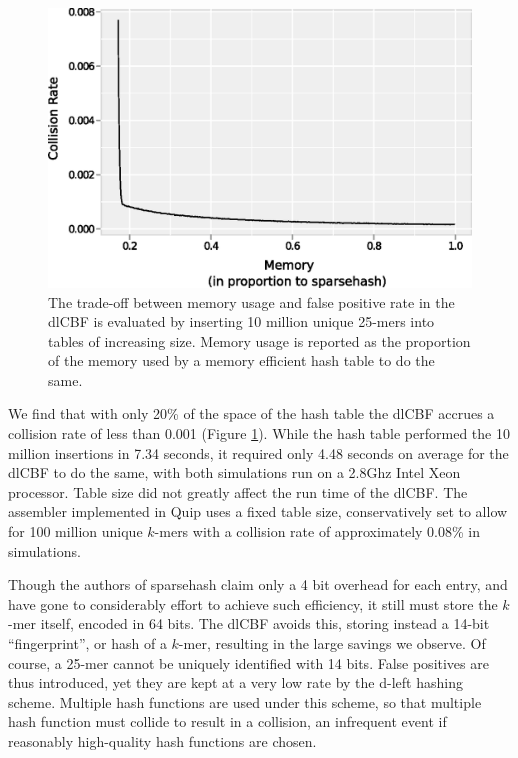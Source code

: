 \documentclass[a4,center,fleqn]{NAR}
\begin{document}
\begin{figure}[h]
\centerline{\includegraphics[width=\columnwidth]{dlcbf.eps}}
\caption{
The trade-off between memory usage and false positive rate in the dlCBF is
evaluated by inserting 10 million unique 25-mers into tables of increasing
size. Memory usage is reported as the proportion of the memory used by a
memory efficient hash table to do the same.
}
\label{fig:dlcbf_bench}
\end{figure}

We find that with only 20\% of the space of the hash table the dlCBF accrues a
collision rate of less than 0.001 (Figure \ref{fig:dlcbf_bench}). While
the hash table performed the 10 million insertions in 7.34 seconds, it
required only 4.48 seconds on average for the dlCBF to do the same, with both
simulations run on a 2.8Ghz Intel Xeon processor. Table size did not greatly
affect the run time of the dlCBF. The assembler implemented in Quip uses a
fixed table size, conservatively set to allow for 100 million unique $k$-mers
with a collision rate of approximately 0.08\% in simulations.

Though the authors of sparsehash claim only a 4 bit overhead for each entry,
and have gone to considerably effort to achieve such efficiency, it still must
store the $k$-mer itself, encoded in 64 bits. The dlCBF avoids this, storing
instead a 14-bit ``fingerprint'', or hash of a $k$-mer, resulting in the large
savings we observe. Of course, a 25-mer cannot be uniquely identified with 14
bits. False positives are thus introduced, yet they are kept at a very low
rate by the d-left hashing scheme. Multiple hash functions are used under this
scheme, so that multiple hash function must collide to result in a
collision, an infrequent event if reasonably high-quality hash functions are
chosen.
\end{document}
